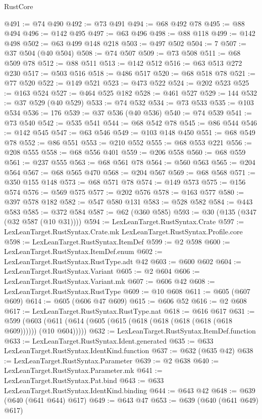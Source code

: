 \begin{lexlean}{RustCore}
\begin{coremodule}
@491 := @74 @490
@492 := @73 @491
@494 := @68 @492 @78
@495 := @88 @494
@496 := @142 @495
@497 := @63 @496
@498 := @88 @118
@499 := @142 @498
@502 := @63 @499 @148 @218
@503 := @497 @502
@504 := 7
@507 := @37 @504 (@40 @504)
@508 := @74 @507
@509 := @73 @508
@511 := @68 @509 @78
@512 := @88 @511
@513 := @142 @512
@516 := @63 @513 @272 @230
@517 := @503 @516
@518 := @486 @517
@520 := @68 @518 @78
@521 := @77 @520
@522 := @149 @521
@523 := @473 @522
@524 := @202 @523
@525 := @163 @524
@527 := @464 @525 @182
@528 := @461 @527
@529 := 144
@532 := @37 @529 (@40 @529)
@533 := @74 @532
@534 := @73 @533
@535 := @103 @534
@536 := 176
@539 := @37 @536 (@40 @536)
@540 := @74 @539
@541 := @73 @540
@542 := @535 @541
@544 := @68 @542 @78
@545 := @86 @544
@546 := @142 @545
@547 := @63 @546
@549 := @103 @148 @450
@551 := @68 @549 @78
@552 := @86 @551
@553 := @210 @552
@555 := @68 @553 @221
@556 := @208 @555
@558 := @68 @556 @401
@559 := @206 @558
@560 := @68 @559
@561 := @237 @555
@563 := @68 @561 @78
@564 := @560 @563
@565 := @204 @564
@567 := @68 @565 @470
@568 := @204 @567
@569 := @68 @568
@571 := @350 @155 @148
@573 := @68 @571 @78
@574 := @149 @573
@575 := @156 @574
@576 := @569 @575
@577 := @202 @576
@578 := @163 @577
@580 := @397 @578 @182
@582 := @547 @580 @131
@583 := @528 @582
@584 := @443 @583
@585 := @372 @584
@587 := @62 (@360 @585)
@593 := @30 (@135 (@347 (@32 @587 (@10 @31))))
@594 := LexLeanTarget.RustSyntax.Crate
@597 := LexLeanTarget.RustSyntax.Crate.mk LexLeanTarget.RustSyntax.Profile.core
@598 := LexLeanTarget.RustSyntax.ItemDef
@599 := @2 @598
@600 := LexLeanTarget.RustSyntax.ItemDef.enum
@602 := LexLeanTarget.RustSyntax.RustType.adt @42
@603 := @600 @602
@604 := LexLeanTarget.RustSyntax.Variant
@605 := @2 @604
@606 := LexLeanTarget.RustSyntax.Variant.mk
@607 := @606 @42
@608 := LexLeanTarget.RustSyntax.RustType
@609 := @10 @608
@611 := @605 (@607 @609)
@614 := @605 (@606 @47 @609)
@615 := @606 @52
@616 := @2 @608
@617 := LexLeanTarget.RustSyntax.RustType.nat
@618 := @616 @617
@631 := @599 (@603 (@611 (@614 (@605 (@615 (@618 (@618 (@618 (@618 (@618 @609)))))) (@10 @604)))))
@632 := LexLeanTarget.RustSyntax.ItemDef.function
@633 := LexLeanTarget.RustSyntax.Ident.generated
@635 := @633 LexLeanTarget.RustSyntax.IdentKind.function
@637 := @632 (@635 @42)
@638 := LexLeanTarget.RustSyntax.Parameter
@639 := @2 @638
@640 := LexLeanTarget.RustSyntax.Parameter.mk
@641 := LexLeanTarget.RustSyntax.Pat.bind
@643 := @633 LexLeanTarget.RustSyntax.IdentKind.binding
@644 := @643 @42
@648 := @639 (@640 (@641 @644) @617)
@649 := @643 @47
@653 := @639 (@640 (@641 @649) @617)

\end{coremodule}
\end{lexlean}
